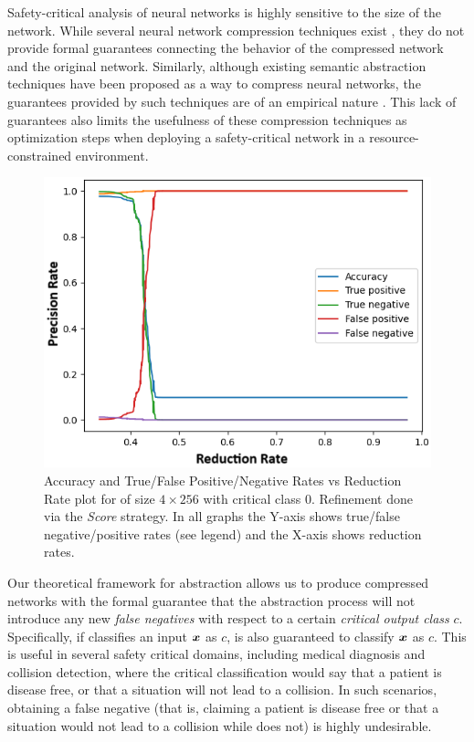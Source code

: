 Safety-critical analysis of neural networks is highly sensitive to the size of
the network. While several neural network compression techniques exist 
\cite{dnn-compression}, they do not provide formal guarantees 
connecting the behavior of the compressed network and the original network.
Similarly, although existing semantic abstraction techniques have been proposed
as a way to compress neural networks, the guarantees provided by such 
techniques are of an empirical nature \cite{lin-comb-abs-jan}.
This lack of guarantees also limits the usefulness of these compression
techniques as optimization steps when deploying a safety-critical network in a
resource-constrained environment. 

\begin{figure}
    \vspace*{-1cm}
    \includegraphics[scale=0.4]{figs/mnist-compr-4-256-samples.png}
    \caption{Accuracy and True/False Positive/Negative Rates vs Reduction Rate
        plot for \mnist of size $4 \times 256$ with critical class 0. Refinement
    done via the \emph{Score} strategy. In all graphs the Y-axis shows
    true/false negative/positive rates (see legend) and the X-axis shows
    reduction rates. }
    \label{f:mnist-class}
    \vspace*{-1cm}
\end{figure}

Our theoretical framework for abstraction allows us to produce compressed
networks with the formal guarantee that the abstraction process will not
introduce any new \emph{false negatives} with respect to a certain
\emph{critical output class} $c$. Specifically, if \cnc classifies an input
$\boldsymbol{x}$ as $c$, \abs is also guaranteed to classify $\boldsymbol{x}$ as $c$. This is
useful in several safety critical domains, including medical diagnosis and
collision detection, where the critical classification would say that a patient
is disease free, or that a situation will not lead to a collision. In such
scenarios, obtaining a false negative (that is, \abs claiming a
patient is disease free or that a situation would not lead to a collision while
\cnc does not) is highly undesirable. 

